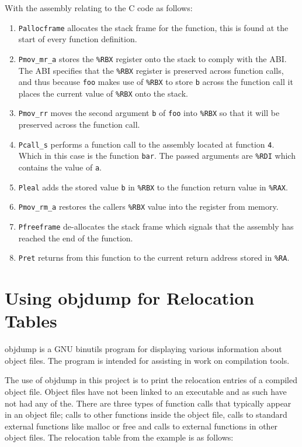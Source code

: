 With the assembly relating to the C code as follows:
\begin{enumerate}
    \item \lstinline{Pallocframe} allocates the stack frame for the function, this is found at the start of every function definition.
    \item \lstinline{Pmov_mr_a} stores the \lstinline{%RBX} register onto the stack to comply with the ABI. The ABI specifies that the \lstinline{%RBX} register is preserved across function calls, and thus because \lstinline{foo} makes use of \lstinline{%RBX} to store \lstinline{b} across the function call it places the current value of \lstinline{%RBX} onto the stack.
    \item \lstinline{Pmov_rr} moves the second argument \lstinline{b} of \lstinline{foo} into \lstinline{%RBX} so that it will be preserved across the function call.
    \item \lstinline{Pcall_s} performs a function call to the assembly located at function \texttt{4}. Which in this case is the function \lstinline{bar}. The passed arguments are \lstinline{%RDI} which contains the value of \lstinline{a}. 
    \item \lstinline{Pleal} adds the stored value \lstinline{b} in \lstinline{%RBX} to the function return value in \lstinline{%RAX}.
    \item \lstinline{Pmov_rm_a} restores the callers \lstinline{%RBX} value into the register from memory.
    \item \lstinline{Pfreeframe} de-allocates the stack frame which signals that the assembly has reached the end of the function.
    \item \lstinline{Pret} returns from this function to the current return address stored in \lstinline{%RA}.
\end{enumerate}

\section{Using objdump for Relocation Tables}\label{objdump}
objdump\cite{objdump} is a GNU binutils program for displaying various information about object files. The program is intended for assisting in work on compilation tools. 

The use of objdump in this project is to print the relocation entries of a compiled object file. Object files have not been linked to an executable and as such have not had any of the. There are three types of function calls that typically appear in an object file; calls to other functions inside the object file, calls to standard external functions like malloc or free and calls to external functions in other object files. The relocation table from the example is as follows:


